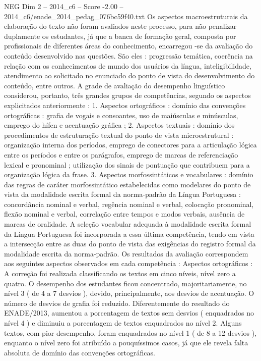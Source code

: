 \begin{textsample}{NEG Dim 2 – 2014\_c6 – Score -2.00 – 2014\_c6/enade\_2014\_pedag\_076bc59f40.txt}
Os aspectos macroestruturais da elaboração do texto não foram avaliados neste processo, para não penalizar duplamente os estudantes, já que a banca de formação geral, composta por profissionais de diferentes áreas do conhecimento, encarregou -se da avaliação do conteúdo desenvolvido nas questões.
São eles : progressão temática, coerência na relação com os conhecimentos de mundo dos usuários da língua, inteligibilidade, atendimento ao solicitado no enunciado do ponto de vista do desenvolvimento do conteúdo, entre outros.
A grade de avaliação do desempenho linguístico considerou, portanto, três grandes grupos de competências, segundo os aspectos explicitados anteriormente : 1.
Aspectos ortográficos : domínio das convenções ortográficas : grafia de vogais e consoantes, uso de maiúsculas e minúsculas, emprego do hífen e acentuação gráfica ; 2.
Aspectos textuais : domínio dos procedimentos de estruturação textual do ponto de vista microestrutural : organização interna dos períodos, emprego de conectores para a articulação lógica entre os períodos e entre os parágrafos, emprego de marcas de referenciação lexical e pronominal ; utilização dos sinais de pontuação que contribuem para a organização lógica da frase. 3.
Aspectos morfossintáticos e vocabulares : domínio das regras de caráter morfossintático estabelecidas como modelares do ponto de vista da modalidade escrita formal da norma-padrão da Língua Portuguesa : concordância nominal e verbal, regência nominal e verbal, colocação pronominal, flexão nominal e verbal, correlação entre tempos e modos verbais, ausência de marcas de oralidade.
A seleção vocabular adequada à modalidade escrita formal da Língua Portuguesa foi incorporada a essa última competência, tendo em vista a intersecção entre as duas do ponto de vista das exigências do registro formal da modalidade escrita da norma-padrão.
Os resultados da avaliação correspondem aos seguintes aspectos observados em cada competência : Aspectos ortográficos : A correção foi realizada classificando os textos em cinco níveis, nível zero a quatro.
O desempenho dos estudantes ficou concentrado, majoritariamente, no nível 3 ( de 4 a 7 desvios ), devido, principalmente, aos desvios de acentuação.
O número de desvios de grafia foi reduzido.
Diferentemente do resultado do ENADE/2013, aumentou a porcentagem de textos sem desvios ( enquadrados no nível 4 ) e diminuiu a porcentagem de textos enquadrados no nível 2.
Alguns textos, com pior desempenho, foram enquadrados no nível 1 ( de 8 a 12 desvios ), enquanto o nível zero foi atribuído a pouquíssimos casos, já que ele revela falta absoluta de domínio das convenções ortográficas.

\end{textsample}
